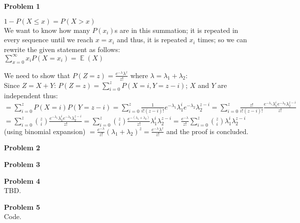 \documentclass{article}
\DeclareMathOperator{\EX}{\mathbb{E}}%
\newenvironment{problem}[2][Problem]
    { \begin{mdframed}[backgroundcolor=gray!20] \textbf{#1 #2} \\}
    {  \end{mdframed}}
\begin{document}
    \begin{problem}{1}
    	\begin{section}{}
    		\noindent
    		$1 - P(X\leq x) = P(X>x)$ \\
    		We want to know how many $P(x_i)$s are in this summation; it is repeated in every 
    		sequence until we reach $x=x_i$ and thus, it is repeated $x_i$ times; so we can 
    		rewrite the given statement as follows:\\
    		$\displaystyle\sum_{x=0}^\infty x_iP(X=x_i) = \EX(X)$
    	\end{section}
    	
    	\begin{section}{}
    		\noindent
    		We need to show that $P(Z=z)=\frac{e^{-\lambda}\lambda^z}{z!}$ where 
    		$\lambda = \lambda_1+\lambda_2$:\\
    		Since $\displaystyle Z=X+Y$: $P(Z=z) = \displaystyle\sum_{i=0}^{z}P(X=i,Y=z-i)$; $X$ and $Y$ are independent 
    		thus:\\ 
    		$=\displaystyle\sum_{i=0}^{z}P(X=i)P(Y=z-i) = \sum_{i=0}^z\frac{1}{i!(z-i)!}e^{-						\lambda_1}\lambda_1^ie^{-\lambda_2}\lambda_2^{z-i} = \sum_{i=0}^z\frac{z!}{i!(z-i)!}					\frac{e^{-\lambda_1}\lambda_1^ie^{-\lambda_2}\lambda_2^{z-i}}{z!}$ \\
    		$= \displaystyle\sum_{i=0}^{z}\displaystyle\binom{z}{i}\frac{e^{-\lambda_1}								\lambda_1^ie^{-\lambda_2}\lambda_2^{z-i}}				{z!} = \displaystyle\sum_{i=0}					^{z}\displaystyle\binom{z}{i}\frac{e^{-(\lambda_1+						\lambda_2)}}{z!}				\lambda_1^i\lambda_2^{z-i} = \frac{e^{-\lambda}}{z!}\displaystyle\sum_{i=0}^{z}							\displaystyle\binom{z}{i}\lambda_1^i\lambda_2^{z-i}$\\
    		(using binomial expansion) $=  \displaystyle\frac{e^{-\lambda}}{z!}(\lambda_1+							\lambda_2)^z = 
    		\frac{e^{-\lambda}\lambda^z}{z!}$ and the proof is concluded.
    		
    	\end{section}
    \end{problem}
    
    \begin{problem}{2}
    	
    \end{problem}
    
    \begin{problem}{3}
    	
    \end{problem}
    
    \begin{problem}{4}
    	TBD.
    \end{problem}
    
    \begin{problem}{5}
    	Code.
    \end{problem}
    
\end{document}
